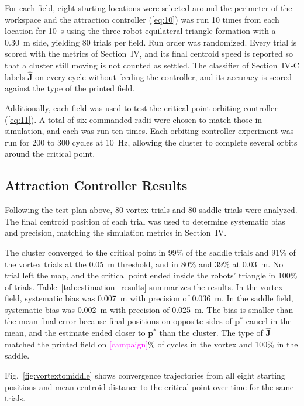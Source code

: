 \documentclass[lettersize,journal]{IEEEtran}
\newcommand{\rev}[1]{#1}
\newcommand{\open}[1]{\textcolor{magenta}{[#1]}}
\begin{document}
For each field, eight starting locations were selected around the perimeter of the workspace and the attraction controller (\ref{eq:10}) was run 10 times from each location for \rev{10}~s using the three-robot equilateral triangle formation with a \rev{0.30}~m side, yielding 80 trials per field. Run order was randomized. Every trial is scored with the metrics of Section~IV, and its final centroid speed is reported so that a cluster still moving is not counted as settled. The classifier of Section~IV-C labels $\hat{\mathbf{J}}$ on every cycle without feeding the controller, and its accuracy is scored against the type of the printed field.

Additionally, each field was used to test the critical point orbiting controller (\ref{eq:11}). A total of \rev{six} commanded radii were chosen to match those in simulation, and each was run \rev{ten} times. Each orbiting controller experiment was run for \rev{200 to 300} cycles at 10~Hz, allowing the cluster to complete several orbits around the critical point.

 \subsection{Attraction Controller Results}

Following the test plan above, \rev{80} vortex trials and \rev{80} saddle trials were analyzed. The final centroid position of each trial was used to determine systematic bias and precision, matching the simulation metrics in Section~IV.

The cluster converged to the critical point in \rev{99}\% of the saddle trials and \rev{91}\% of the vortex trials at the 0.05~m threshold, and in \rev{80}\% and \rev{39}\% at 0.03~m. No trial left the map, and the critical point ended inside the robots' triangle in \rev{100}\% of trials. Table~\ref{tab:estimation_results} summarizes the results. In the vortex field, systematic bias was \rev{0.007}~m with precision of \rev{0.036}~m. In the saddle field, systematic bias was \rev{0.002}~m with precision of \rev{0.025}~m. The bias is smaller than the mean final error because final positions on opposite sides of $\mathbf{p}^*$ cancel in the mean, and the estimate ended closer to $\mathbf{p}^*$ than the cluster. The type of $\hat{\mathbf{J}}$ matched the printed field on \open{campaign}\% of cycles in the vortex and \rev{100}\% in the saddle.

Fig.~\ref{fig:vortextomiddle} shows convergence trajectories from all eight starting positions and mean centroid distance to the critical point over time for the same trials.
\end{document}
